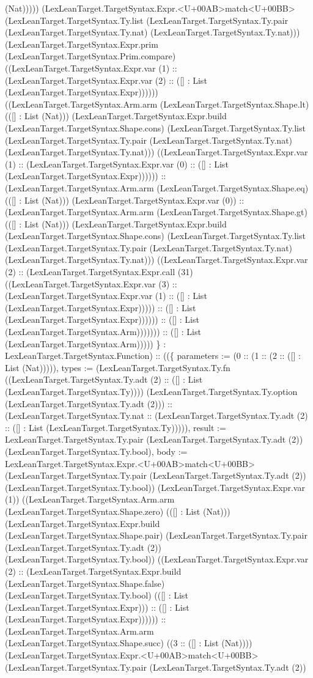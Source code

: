 \documentclass[11pt]{article}
\begin{document}
(Nat))))) (LexLeanTarget.TargetSyntax.Expr.<U+00AB>match<U+00BB> (LexLeanTarget.TargetSyntax.Ty.list (LexLeanTarget.TargetSyntax.Ty.pair (LexLeanTarget.TargetSyntax.Ty.nat) (LexLeanTarget.TargetSyntax.Ty.nat))) (LexLeanTarget.TargetSyntax.Expr.prim (LexLeanTarget.TargetSyntax.Prim.compare) ((LexLeanTarget.TargetSyntax.Expr.var (1) :: (LexLeanTarget.TargetSyntax.Expr.var (2) :: ([] : List (LexLeanTarget.TargetSyntax.Expr)))))) ((LexLeanTarget.TargetSyntax.Arm.arm (LexLeanTarget.TargetSyntax.Shape.lt) (([] : List (Nat))) (LexLeanTarget.TargetSyntax.Expr.build (LexLeanTarget.TargetSyntax.Shape.cons) (LexLeanTarget.TargetSyntax.Ty.list (LexLeanTarget.TargetSyntax.Ty.pair (LexLeanTarget.TargetSyntax.Ty.nat) (LexLeanTarget.TargetSyntax.Ty.nat))) ((LexLeanTarget.TargetSyntax.Expr.var (1) :: (LexLeanTarget.TargetSyntax.Expr.var (0) :: ([] : List (LexLeanTarget.TargetSyntax.Expr)))))) :: (LexLeanTarget.TargetSyntax.Arm.arm (LexLeanTarget.TargetSyntax.Shape.eq) (([] : List (Nat))) (LexLeanTarget.TargetSyntax.Expr.var (0)) :: (LexLeanTarget.TargetSyntax.Arm.arm (LexLeanTarget.TargetSyntax.Shape.gt) (([] : List (Nat))) (LexLeanTarget.TargetSyntax.Expr.build (LexLeanTarget.TargetSyntax.Shape.cons) (LexLeanTarget.TargetSyntax.Ty.list (LexLeanTarget.TargetSyntax.Ty.pair (LexLeanTarget.TargetSyntax.Ty.nat) (LexLeanTarget.TargetSyntax.Ty.nat))) ((LexLeanTarget.TargetSyntax.Expr.var (2) :: (LexLeanTarget.TargetSyntax.Expr.call (31) ((LexLeanTarget.TargetSyntax.Expr.var (3) :: (LexLeanTarget.TargetSyntax.Expr.var (1) :: ([] : List (LexLeanTarget.TargetSyntax.Expr))))) :: ([] : List (LexLeanTarget.TargetSyntax.Expr)))))) :: ([] : List (LexLeanTarget.TargetSyntax.Arm))))))) :: ([] : List (LexLeanTarget.TargetSyntax.Arm))))) \} : LexLeanTarget.TargetSyntax.Function) :: ((\{ parameters := (0 :: (1 :: (2 :: ([] : List (Nat))))), types := (LexLeanTarget.TargetSyntax.Ty.fn ((LexLeanTarget.TargetSyntax.Ty.adt (2) :: ([] : List (LexLeanTarget.TargetSyntax.Ty)))) (LexLeanTarget.TargetSyntax.Ty.option (LexLeanTarget.TargetSyntax.Ty.adt (2))) :: (LexLeanTarget.TargetSyntax.Ty.nat :: (LexLeanTarget.TargetSyntax.Ty.adt (2) :: ([] : List (LexLeanTarget.TargetSyntax.Ty))))), result := LexLeanTarget.TargetSyntax.Ty.pair (LexLeanTarget.TargetSyntax.Ty.adt (2)) (LexLeanTarget.TargetSyntax.Ty.bool), body := LexLeanTarget.TargetSyntax.Expr.<U+00AB>match<U+00BB> (LexLeanTarget.TargetSyntax.Ty.pair (LexLeanTarget.TargetSyntax.Ty.adt (2)) (LexLeanTarget.TargetSyntax.Ty.bool)) (LexLeanTarget.TargetSyntax.Expr.var (1)) ((LexLeanTarget.TargetSyntax.Arm.arm (LexLeanTarget.TargetSyntax.Shape.zero) (([] : List (Nat))) (LexLeanTarget.TargetSyntax.Expr.build (LexLeanTarget.TargetSyntax.Shape.pair) (LexLeanTarget.TargetSyntax.Ty.pair (LexLeanTarget.TargetSyntax.Ty.adt (2)) (LexLeanTarget.TargetSyntax.Ty.bool)) ((LexLeanTarget.TargetSyntax.Expr.var (2) :: (LexLeanTarget.TargetSyntax.Expr.build (LexLeanTarget.TargetSyntax.Shape.false) (LexLeanTarget.TargetSyntax.Ty.bool) (([] : List (LexLeanTarget.TargetSyntax.Expr))) :: ([] : List (LexLeanTarget.TargetSyntax.Expr)))))) :: (LexLeanTarget.TargetSyntax.Arm.arm (LexLeanTarget.TargetSyntax.Shape.succ) ((3 :: ([] : List (Nat)))) (LexLeanTarget.TargetSyntax.Expr.<U+00AB>match<U+00BB> (LexLeanTarget.TargetSyntax.Ty.pair (LexLeanTarget.TargetSyntax.Ty.adt (2)) 
\end{document}
